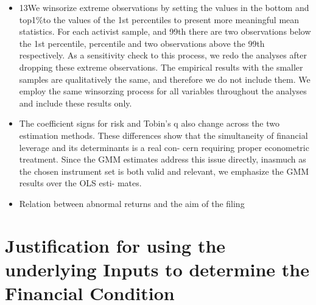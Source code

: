 \documentclass[12pt]{article}
\begin{document}
\begin{itemize}
        \item 13We winsorize extreme observations by setting the values in the bottom and top1\%to the values of the 1st percentiles to present more meaningful mean statistics. For each activist sample, and 99th there are two observations below the 1st percentile, percentile and two observations above the 99th respectively. As a sensitivity check to this process, we redo the analyses after dropping these extreme observations. The empirical results with the smaller samples are qualitatively the same, and therefore we do not include them. We employ the same winsorzing process for all variables
        throughout the analyses and include these results only.

        \item The coefficient signs for risk and Tobin’s q also change across the two estimation methods. These differences show that the simultaneity of financial leverage and its determinants is a real con- cern requiring proper econometric treatment. Since the GMM estimates address this issue directly, inasmuch as the chosen instrument set is both valid and relevant, we emphasize the GMM results over the OLS esti- mates. \citep{MacKay2005}

        \item Relation between abnormal returns and the aim of the filing \citep{Brav2008}
    \end{itemize}

\section{Justification for using the underlying Inputs to determine the Financial Condition}
\end{document}
